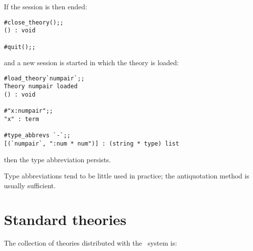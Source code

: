 \noindent If the session is then ended:

\begin{session}\begin{verbatim}
#close_theory();;
() : void

#quit();;
\end{verbatim}\end{session}

\noindent and a new session is started in which the theory  is
loaded:

\setcounter{sessioncount}{1}
\begin{session}\begin{verbatim}
#load_theory`numpair`;;
Theory numpair loaded
() : void

#"x:numpair";;
"x" : term

#type_abbrevs `-`;;
[(`numpair`, ":num * num")] : (string * type) list
\end{verbatim}\end{session}

\noindent then the type abbreviation persists.

Type abbreviations tend to be little used in practice; the antiquotation
method is usually sufficient.

\section{Standard theories}

The collection of theories distributed with the \HOL\ system
is:

